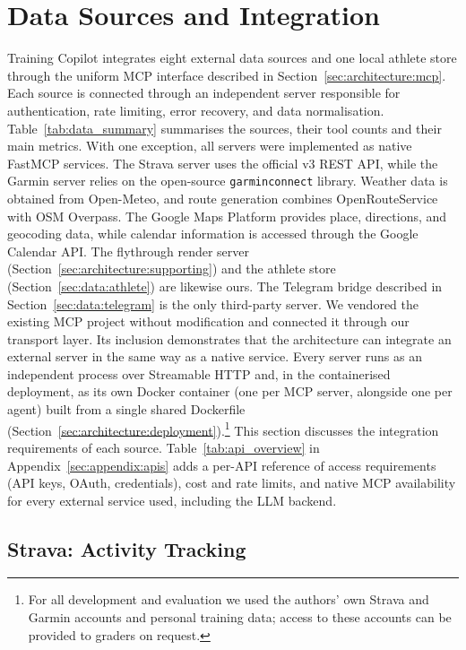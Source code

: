 \section{Data Sources and Integration}\label{sec:data}

Training Copilot integrates eight external data sources and one local athlete store through the uniform MCP interface described in Section~\ref{sec:architecture:mcp}. Each source is connected through an independent server responsible for authentication, rate limiting, error recovery, and data normalisation. Table~\ref{tab:data_summary} summarises the sources, their tool counts and their main metrics. With one exception, all servers were implemented as native FastMCP services. The Strava server uses the official v3 REST API, while the Garmin server relies on the open-source \texttt{garminconnect} library. Weather data is obtained from Open-Meteo, and route generation combines OpenRouteService with OSM Overpass. The Google Maps Platform provides place, directions, and geocoding data, while calendar information is accessed through the Google Calendar API. The flythrough render server (Section~\ref{sec:architecture:supporting}) and the athlete store (Section~\ref{sec:data:athlete}) are likewise ours. The Telegram bridge described in Section~\ref{sec:data:telegram} is the only third-party server. We vendored the existing MCP project without modification and connected it through our transport layer. Its inclusion demonstrates that the architecture can integrate an external server in the same way as a native service. Every server runs as an independent process over Streamable HTTP and, in the containerised deployment, as its own Docker container (one per MCP server, alongside one per agent) built from a single shared Dockerfile (Section~\ref{sec:architecture:deployment}).\footnote{For all development and evaluation we used the authors' own Strava and Garmin accounts and personal training data; access to these accounts can be provided to graders on request.} This section discusses the integration requirements of each source. Table~\ref{tab:api_overview} in Appendix~\ref{sec:appendix:apis} adds a per-API reference of access requirements (API keys, OAuth, credentials), cost and rate limits, and native MCP availability for every external service used, including the LLM backend.

\subsection{Strava: Activity Tracking}\label{sec:data:strava}

